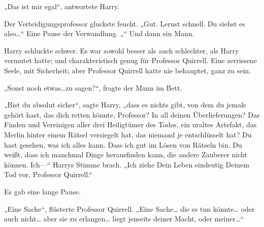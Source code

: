 „Das ist mir egal“, antwortete Harry.

Der Verteidigungsprofessor gluckste feucht.
„Gut. Lernst schnell. Du siehst es also…“
Eine Pause der Verwandlung.
„“
Und dann ein Mann.

Harry schluckte schwer. Es war sowohl besser als auch schlechter, als Harry vermutet hatte; und charakteristisch genug für Professor Quirrell.
Eine zerrissene Seele, mit Sicherheit; aber Professor Quirrell hatte nie behauptet, ganz zu sein.

„Sonst noch etwas…zu sagen?“, fragte der Mann im Bett.

„Bist du absolut sicher“, sagte Harry, „dass es nichts gibt, von dem du jemals gehört hast, das dich retten könnte, Professor? In all deinen Überlieferungen? Das Finden und Vereinigen aller drei Heiligtümer des Todes, ein uraltes Artefakt, das Merlin hinter einem Rätsel versiegelt hat, das niemand je entschlüsselt hat? Du hast gesehen, was ich alles kann. Dass ich gut im Lösen von Rätseln bin. Du weißt, dass ich manchmal Dinge herausfinden kann, die andere Zauberer nicht können. Ich—“
Harrys Stimme brach.
„Ich ziehe Dein Leben eindeutig Deinem Tod vor, Professor Quirrell.“

Es gab eine lange Pause.

„Eine Sache“, flüsterte Professor Quirrell. „Eine Sache… die es tun könnte… oder auch nicht… aber sie zu erlangen… liegt jenseits deiner Macht, oder meiner…“

